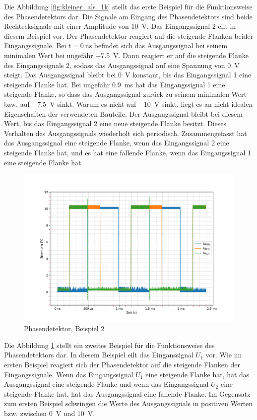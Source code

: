 Die Abbildung \ref{fig:kleiner_als_1k} stellt das erste Beispiel für die Funktionsweise des Phasendetektors dar. Die Signale am Eingang des Phasendetektors sind beide Rechtecksignale mit einer Amplitude von \SI{10}{\volt}. Das Eingangssignal 2 eilt in diesem Beispiel vor. Der Phasendetektor reagiert auf die steigende Flanken beider Eingangssignale. Bei $t=\SI{0}{\nano\second}$ befindet sich das Ausgangssignal bei seinem minimalen Wert bei ungefähr \SI{-7,5}{\volt}. Dann reagiert er auf die steigende Flanke des Eingangssignals 2, sodass das Ausgangssignal auf eine Spannung von \SI{0}{\volt} steigt. Das Ausgangssignal bleibt bei \SI{0}{\volt} konstant, bis das Eingangssignal 1 eine steigende Flanke hat. Bei ungefähr \SI{0,9}{\milli\second} hat das Eingangssignal 1 eine steigende Flanke, so dass das Ausgangssignal zurück zu seinem minimalen Wert bzw. auf \SI{-7,5}{\volt} sinkt. Warum es nicht auf \SI{-10}{\volt} sinkt, liegt es an nicht idealen Eigenschaften der verwendeten Bauteile. Der Ausgangssignal bleibt bei diesem Wert, bis das Eingangssignal 2 eine neue steigende Flanke besitzt. Dieses Verhalten des Ausgangssignals wiederholt sich periodisch. Zusammengefasst hat das Ausgangssignal eine steigende Flanke, wenn das Eingangssignal 2 eine steigende Flanke hat, und es hat eine fallende Flanke, wenn das Eingangssignal 1 eine steigende Flanke hat.

\begin{figure}[H]
  \centering
  \includegraphics[width=0.8\linewidth]{Elektronik-Laborprotokoll_PLL/Plots/mehr_als_1k_oben-1.pdf}
  \caption{Phasendetektor, Beispiel 2}
  \label{fig:mehr_als_1k}
\end{figure}

Die Abbildung \ref{fig:mehr_als_1k} stellt ein zweites Beispiel für die Funktionsweise des Phasendetektors dar. In diesem Beispiel eilt das Einganssignal $U_1$ vor. Wie im ersten Beispiel reagiert sich der Phasendetektor auf die steigende Flanken der Eingangssignale. Wenn das Eingangssignal $U_1$ eine steigende Flanke hat, hat das Ausgangssignal eine steigende Flanke und wenn das Eingangssignal $U_2$ eine steigende Flanke hat, hat das Ausgangssignal eine fallende Flanke. Im Gegensatz zum ersten Beispiel schwingen die Werte des Ausgangssignals in positiven Werten bzw. zwischen \SI{0}{\volt} und \SI{10}{\volt}. 

